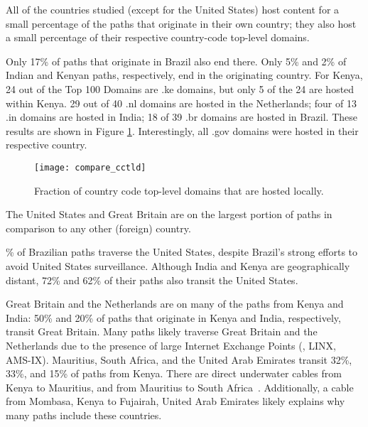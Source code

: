\begin{finding}
All of the countries studied (except for the United States) host content for a small percentage of the paths that originate in their own country; they also host a small percentage of their respective country-code top-level domains.
\end{finding}
\noindent
Only 17\% of paths that originate in Brazil also end there.  Only 5\%
and 2\% of Indian and Kenyan paths, respectively, end in the originating
country.  
For Kenya, 24 out of the Top 100 Domains are .ke domains, but only 5
of the 24 are hosted within Kenya.  29 out of 40 .nl domains are hosted in the Netherlands;
four of 13 .in domains are hosted in India; 18 of 39 .br domains are hosted in Brazil.  These 
results are shown in Figure \ref{fig:cctld_graph}.  Interestingly, all .gov domains were hosted in their respective country. 

\begin{figure}[t]
\centering
\texttt{[image: compare\_cctld]}
\caption{Fraction of country code top-level domains that are hosted locally.}
\label{fig:cctld_graph}
\end{figure}

\begin{finding}
The United States and Great Britain are on the largest portion of paths in comparison to any other (foreign) country.
\end{finding}
\% of Brazilian paths traverse the United States, despite Brazil's
strong efforts to avoid United States surveillance.  Although India and
Kenya are geographically distant, 72\% and 62\% of their paths also transit
the United States.

Great Britain and the Netherlands are on 
many of the paths from Kenya and India:
50\% and 20\% of
paths that originate in Kenya and India, respectively, transit Great
Britain.   Many paths likely traverse Great Britain and the Netherlands due to
the presence of large Internet Exchange Points (\ie, LINX, AMS-IX).
Mauritius, South Africa, and the United Arab Emirates transit 32\%,
33\%, and 15\% of paths from Kenya.  There are direct underwater cables
from Kenya to Mauritius, and from Mauritius to South
Africa~\cite{cablemap}.  Additionally, a cable from Mombasa,
Kenya to Fujairah, United Arab Emirates likely explains why many
paths include these countries. 



